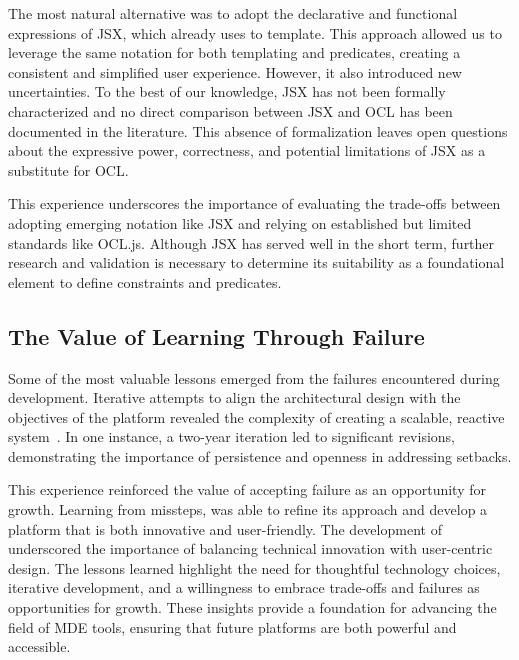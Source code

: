 The most natural alternative was to adopt the declarative and functional expressions of JSX, which \jjodel{} already uses to template. This approach allowed us to leverage the same notation for both templating and predicates, creating a consistent and simplified user experience. However, it also introduced new uncertainties. To the best of our knowledge, JSX has not been formally characterized and no direct comparison between JSX and OCL has been documented in the literature. This absence of formalization leaves open questions about the expressive power, correctness, and potential limitations of JSX as a substitute for OCL.

This experience underscores the importance of evaluating the trade-offs between adopting emerging notation like JSX and relying on established but limited standards like OCL.js. Although JSX has served \jjodel{} well in the short term, further research and validation is necessary to determine its suitability as a foundational element to define constraints and predicates.

\subsection{The Value of Learning Through Failure}

Some of the most valuable lessons emerged from the failures encountered during development. Iterative attempts to align the architectural design with the objectives of the platform revealed the complexity of creating a scalable, reactive system~\cite{lyytinen1999learning}. In one instance, a two-year iteration led to significant revisions, demonstrating the importance of persistence and openness in addressing setbacks.

This experience reinforced the value of accepting failure as an opportunity for growth. Learning from missteps, \jjodel{} was able to refine its approach and develop a platform that is both innovative and user-friendly. The development of \jjodel{} underscored the importance of balancing technical innovation with user-centric design. The lessons learned highlight the need for thoughtful technology choices, iterative development, and a willingness to embrace trade-offs and failures as opportunities for growth. These insights provide a foundation for advancing the field of MDE tools, ensuring that future platforms are both powerful and accessible.